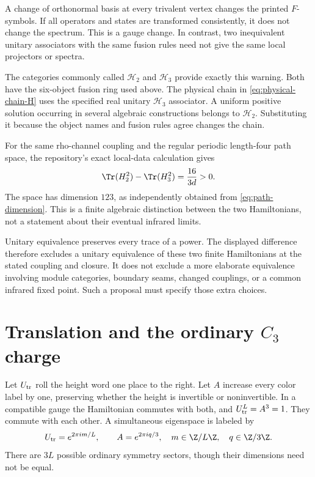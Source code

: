 A change of orthonormal basis at every trivalent vertex changes the printed
$F$-symbols. If all operators and states are transformed consistently, it
does not change the spectrum. This is a gauge change. In contrast, two
inequivalent unitary associators with the same fusion rules need not give
the same local projectors or spectra.

The categories commonly called $\mathcal H_2$ and $\mathcal H_3$ provide exactly this warning.
Both have the six-object fusion ring used above. The physical chain in
\eqref{eq:physical-chain-H} uses the specified real unitary $\mathcal H_3$
associator. A uniform positive solution occurring in several algebraic
constructions belongs to $\mathcal H_2$. Substituting it because the object names
and fusion rules agree changes the chain.

\begin{constructioninput}
For the same rho-channel coupling and the regular periodic length-four
path space, the repository's exact local-data calculation gives
\[
 \Tr(H_2^2)-\Tr(H_3^2)=\frac{16}{3d}>0.
\]
The space has dimension $123$, as independently obtained from
\eqref{eq:path-dimension}. This is a finite algebraic distinction between
the two Hamiltonians, not a statement about their eventual infrared limits.
\end{constructioninput}

Unitary equivalence preserves every trace of a power. The displayed
difference therefore excludes a unitary equivalence of these two finite
Hamiltonians at the stated coupling and closure. It does not exclude a
more elaborate equivalence involving module categories, boundary seams,
changed couplings, or a common infrared fixed point. Such a proposal must
specify those extra choices.

\section{Translation and the ordinary \texorpdfstring{$C_3$}{C3} charge}

Let $U_{\rm tr}$ roll the height word one place to the right. Let $A$ increase every
color label by one, preserving whether the height is invertible or
noninvertible. In a compatible gauge the Hamiltonian commutes with both,
and $U_{\rm tr}^L=A^3=1$. They commute with each other. A simultaneous eigenspace
is labeled by
\[
 U_{\rm tr}=e^{2\pi im/L},\qquad A=e^{2\pi iq/3},
 \quad m\in\Z/L\Z,\quad q\in\Z/3\Z.
\]
There are $3L$ possible ordinary symmetry sectors, though their dimensions
need not be equal.

